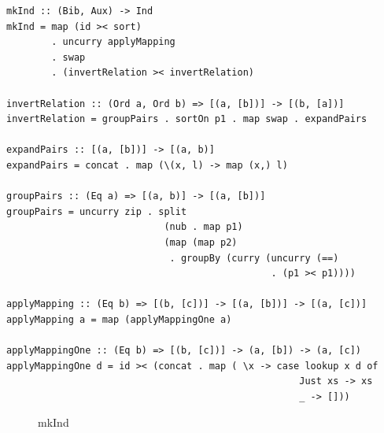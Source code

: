 \documentclass[a4paper,11pt]{article}
\begin{document}
\begin{verbatim}
mkInd :: (Bib, Aux) -> Ind
mkInd = map (id >< sort) 
		. uncurry applyMapping 
		. swap 
		. (invertRelation >< invertRelation)

invertRelation :: (Ord a, Ord b) => [(a, [b])] -> [(b, [a])]
invertRelation = groupPairs . sortOn p1 . map swap . expandPairs

expandPairs :: [(a, [b])] -> [(a, b)]
expandPairs = concat . map (\(x, l) -> map (x,) l)

groupPairs :: (Eq a) => [(a, b)] -> [(a, [b])]
groupPairs = uncurry zip . split
							(nub . map p1)
							(map (map p2) 
							 . groupBy (curry (uncurry (==) 
							 		           . (p1 >< p1))))

applyMapping :: (Eq b) => [(b, [c])] -> [(a, [b])] -> [(a, [c])]
applyMapping a = map (applyMappingOne a)

applyMappingOne :: (Eq b) => [(b, [c])] -> (a, [b]) -> (a, [c])
applyMappingOne d = id >< (concat . map ( \x -> case lookup x d of 
													Just xs -> xs
													_ -> []))
\end{verbatim}
	
\begin{figure}[H]
	\centering
	\caption{mkInd}
\end{figure}
	
\end{document}

